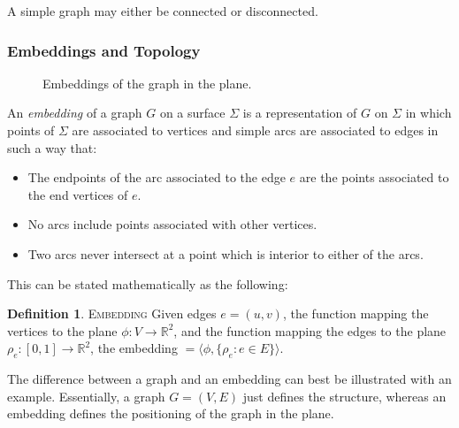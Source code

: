 \documentclass[11pt]{article}
\newcommand{\R}{\mathbb{R}}
\theoremstyle{definition}
\newtheorem{definition}{Definition}[section]
\begin{document}
	A simple graph may either be connected or disconnected.
	
\subsubsection{Embeddings and Topology}
    
    \begin{figure}%
		\centering
		\qquad
		\caption[]{Embeddings of the graph in the plane.}%
		\label{fig:embedding}
	\end{figure}
    
    	An \emph{embedding} of a graph $G$ on a surface $\Sigma$ is a representation of $G$ on $\Sigma$ in which points of $\Sigma$ are associated to vertices and simple arcs are associated to edges in such a way that:
  		\begin{itemize}
			\item The endpoints of the arc associated to the edge $e$ are the points associated to the end vertices of $e$.
			\item No arcs include points associated with other vertices.
			\item Two arcs never intersect at a point which is interior to either of the arcs.
  		\end{itemize}

	This can be stated mathematically as the following: 
	\theoremstyle{definition}
	\begin{definition}{\textsc{Embedding}}
		Given edges $e=(u,v)$, the function mapping the vertices to the plane $ \phi :V \rightarrow \R^2$, and the function mapping the edges to the plane $ \rho_e :[0,1] \rightarrow \R^2$, the embedding $= \langle \phi, \{\rho_e : e \in E \} \rangle$. 
	\end{definition}
		The difference between a graph and an embedding can best be illustrated with an example. 
		Essentially, a graph $G=(V,E)$ just defines the structure, whereas an embedding defines the positioning of the graph in the plane.
	
\end{document}
